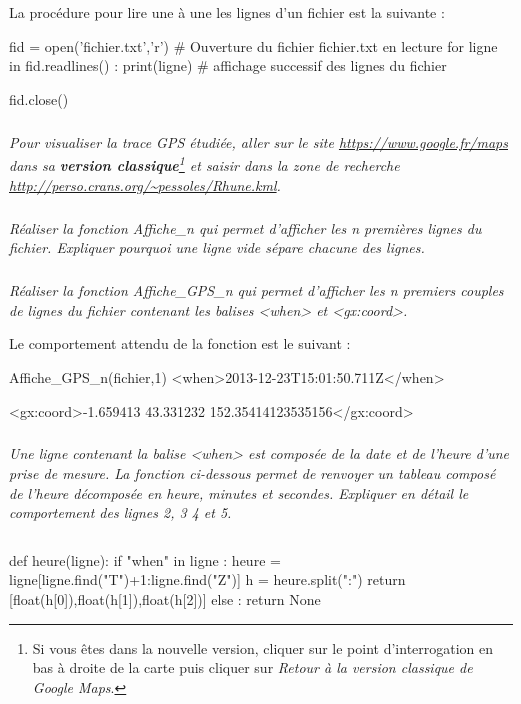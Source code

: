 \documentclass[10pt,oneside]{article}
\begin{document}
\begin{py}
La procédure pour lire une à une les lignes d'un fichier est la suivante :

\begin{python}

fid = open('fichier.txt','r') # Ouverture du fichier fichier.txt en lecture
for ligne in fid.readlines() :
    print(ligne) # affichage successif des lignes du fichier

fid.close()
\end{python}
\end{py}


\subparagraph{}
\textit{Pour visualiser la trace GPS étudiée, aller sur le site \url{https://www.google.fr/maps} dans sa \textbf{version classique}\footnote{Si vous êtes dans la nouvelle version, cliquer sur le point d'interrogation en bas à droite de la carte puis cliquer sur \textit{Retour à la version classique de Google Maps}.} et saisir dans la zone de recherche \url{http://perso.crans.org/~pessoles/Rhune.kml}.}

\subparagraph{}
\textit{Réaliser la fonction \textsf{Affiche\_n} qui permet d'afficher les n premières lignes du fichier. Expliquer pourquoi une ligne vide sépare chacune des lignes.}


\subparagraph{}
\textit{Réaliser la fonction \textsf{Affiche\_GPS\_n} qui permet d'afficher les n premiers couples de lignes du fichier contenant les balises \textsf{<when>} et \textsf{<gx:coord>}.}
\begin{exemple}
Le comportement attendu de la fonction est le suivant :
\begin{py}
\begin{python}
Affiche_GPS_n(fichier,1)
    <when>2013-12-23T15:01:50.711Z</when>
    
    <gx:coord>-1.659413 43.331232 152.35414123535156</gx:coord>
    
\end{python}
\end{py}
\end{exemple}


\subparagraph{}
\textit{Une ligne contenant la balise \textsf{<when>} est composée de la date et de l'heure d'une prise de mesure. La fonction ci-dessous permet de renvoyer un tableau composé de l'heure décomposée en heure, minutes et secondes. Expliquer en détail le comportement des lignes 2, 3 4 et 5.}

\begin{py}
\begin{minipage}[c]{.1\linewidth}
$$ $$
\end{minipage}\hfill
\begin{minipage}[c]{.8\linewidth}
\begin{python_nb}
def heure(ligne):
    if "when" in ligne :
        heure = ligne[ligne.find("T")+1:ligne.find("Z")]
        h = heure.split(":")
        return [float(h[0]),float(h[1]),float(h[2])]
    else :
        return None
\end{python_nb}
\end{minipage}
\end{py}
\end{document}
